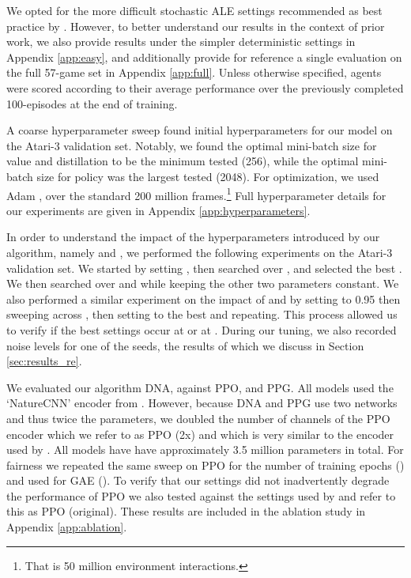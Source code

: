 \documentclass{article}
\begin{document}
We opted for the more difficult stochastic ALE settings recommended as best practice by \cite{machado2018revisiting}. However, to better understand our results in the context of prior work, we also provide results under the simpler deterministic settings in Appendix \ref{app:easy}, and additionally provide for reference a single evaluation on the full 57-game set in Appendix \ref{app:full}. Unless otherwise specified, agents were scored according to their average performance over the previously completed 100-episodes at the end of training.

A coarse hyperparameter sweep found initial hyperparameters for our model on the Atari-3 validation set. Notably, we found the optimal mini-batch size for value and distillation to be the minimum tested (256), while the optimal mini-batch size for policy was the largest tested (2048). For optimization, we used Adam \cite{kingma2014adam}, over the standard 200 million frames.\footnote{That is 50 million environment interactions.} Full hyperparameter details for our experiments are given in Appendix \ref{app:hyperparameters}.

In order to understand the impact of the hyperparameters introduced by our algorithm, namely  and , we performed the following experiments on the Atari-3 validation set. We started by setting , then searched over , and selected the best . We then searched over  and  while keeping the other two parameters constant. We also performed a similar experiment on the impact of  and  by setting  to 0.95 then sweeping across , then setting  to the best  and repeating. This process allowed us to verify if the best settings occur at  or at . During our  tuning, we also recorded noise levels for one of the seeds, the results of which we discuss in Section \ref{sec:results_re}.

We evaluated our algorithm DNA, against PPO, and PPG. All models used the `NatureCNN' encoder from \cite{mnih2015human}. However, because DNA and PPG use two networks and thus twice the parameters, we doubled the number of channels of the PPO encoder which we refer to as PPO (2x) and which is very similar to the encoder used by \cite{badia2020agent57}. All models have have approximately 3.5 million parameters in total. For fairness we repeated the same sweep on PPO for the number of training epochs () and  used for GAE (). To verify that our settings did not inadvertently degrade the performance of PPO we also tested against the settings used by \cite{schulman2017proximal} and refer to this as PPO (original). These results are included in the ablation study in Appendix \ref{app:ablation}.
\end{document}
